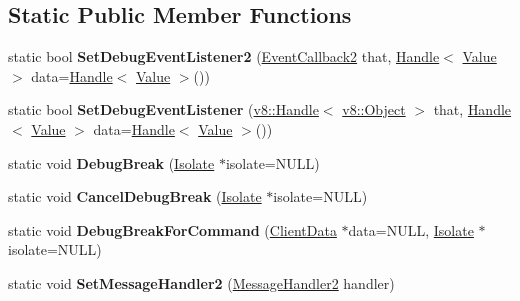 \subsection*{Static Public Member Functions}
\begin{DoxyCompactItemize}
\item 
\hypertarget{classv8_1_1_debug_aff46ffb7c2a8e9c6549a7ef74452fce5}{}static bool {\bfseries Set\+Debug\+Event\+Listener2} (\hyperlink{classv8_1_1_debug_aae787219311eeedcbbe2c63cf36d1e53}{Event\+Callback2} that, \hyperlink{classv8_1_1_handle}{Handle}$<$ \hyperlink{classv8_1_1_value}{Value} $>$ data=\hyperlink{classv8_1_1_handle}{Handle}$<$ \hyperlink{classv8_1_1_value}{Value} $>$())\label{classv8_1_1_debug_aff46ffb7c2a8e9c6549a7ef74452fce5}

\item 
\hypertarget{classv8_1_1_debug_a9195f4cb819848a07dc71a5bae43274d}{}static bool {\bfseries Set\+Debug\+Event\+Listener} (\hyperlink{classv8_1_1_handle}{v8\+::\+Handle}$<$ \hyperlink{classv8_1_1_object}{v8\+::\+Object} $>$ that, \hyperlink{classv8_1_1_handle}{Handle}$<$ \hyperlink{classv8_1_1_value}{Value} $>$ data=\hyperlink{classv8_1_1_handle}{Handle}$<$ \hyperlink{classv8_1_1_value}{Value} $>$())\label{classv8_1_1_debug_a9195f4cb819848a07dc71a5bae43274d}

\item 
\hypertarget{classv8_1_1_debug_a4bbac4c6f09faebe196d9403173d1707}{}static void {\bfseries Debug\+Break} (\hyperlink{classv8_1_1_isolate}{Isolate} $\ast$isolate=N\+U\+L\+L)\label{classv8_1_1_debug_a4bbac4c6f09faebe196d9403173d1707}

\item 
\hypertarget{classv8_1_1_debug_ae3177873bb9de871eaa9e7881c8a8e49}{}static void {\bfseries Cancel\+Debug\+Break} (\hyperlink{classv8_1_1_isolate}{Isolate} $\ast$isolate=N\+U\+L\+L)\label{classv8_1_1_debug_ae3177873bb9de871eaa9e7881c8a8e49}

\item 
\hypertarget{classv8_1_1_debug_ab7dba882551c995c484224c7dfebc9bd}{}static void {\bfseries Debug\+Break\+For\+Command} (\hyperlink{classv8_1_1_debug_1_1_client_data}{Client\+Data} $\ast$data=N\+U\+L\+L, \hyperlink{classv8_1_1_isolate}{Isolate} $\ast$isolate=N\+U\+L\+L)\label{classv8_1_1_debug_ab7dba882551c995c484224c7dfebc9bd}

\item 
\hypertarget{classv8_1_1_debug_a0375563b2a1e0b4ea5f70a742209bb3f}{}static void {\bfseries Set\+Message\+Handler2} (\hyperlink{classv8_1_1_debug_a0fb8f7e1f8fa47cb23f7ad72cd533c77}{Message\+Handler2} handler)\label{classv8_1_1_debug_a0375563b2a1e0b4ea5f70a742209bb3f}


\end{DoxyCompactItemize}
